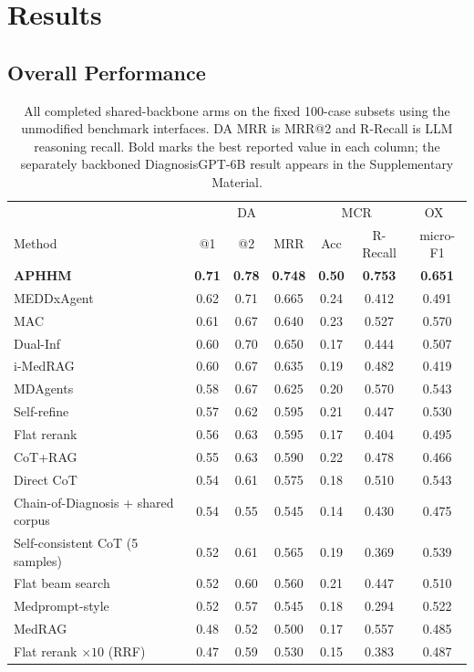 \documentclass[letterpaper]{article} %
\begin{document}
\section{Results}
\label{sec:results}

\subsection{Overall Performance}
\label{sec:main-results}

\begin{table}[t]
\centering
\small
\begin{tabular}{@{}lcccccc@{}}
\toprule
& \multicolumn{3}{c}{DA~\cite{diagnosisarena}} &
\multicolumn{2}{c}{MCR~\cite{medcasereasoning}} &
\multicolumn{1}{c}{OX~\cite{dualinf2025}} \\
Method & @1 & @2 & MRR & Acc & R-Recall & micro-F1 \\
\midrule
\textbf{APHHM} & \textbf{0.71} & \textbf{0.78} & \textbf{0.748} & \textbf{0.50} & \textbf{0.753} & \textbf{0.651} \\
MEDDxAgent & 0.62 & 0.71 & 0.665 & 0.24 & 0.412 & 0.491 \\
MAC & 0.61 & 0.67 & 0.640 & 0.23 & 0.527 & 0.570 \\
Dual-Inf & 0.60 & 0.70 & 0.650 & 0.17 & 0.444 & 0.507 \\
i-MedRAG & 0.60 & 0.67 & 0.635 & 0.19 & 0.482 & 0.419 \\
MDAgents & 0.58 & 0.67 & 0.625 & 0.20 & 0.570 & 0.543 \\
Self-refine & 0.57 & 0.62 & 0.595 & 0.21 & 0.447 & 0.530 \\
Flat rerank & 0.56 & 0.63 & 0.595 & 0.17 & 0.404 & 0.495 \\
CoT+RAG & 0.55 & 0.63 & 0.590 & 0.22 & 0.478 & 0.466 \\
Direct CoT & 0.54 & 0.61 & 0.575 & 0.18 & 0.510 & 0.543 \\
Chain-of-Diagnosis + shared corpus & 0.54 & 0.55 & 0.545 & 0.14 & 0.430 & 0.475 \\
Self-consistent CoT (5 samples) & 0.52 & 0.61 & 0.565 & 0.19 & 0.369 & 0.539 \\
Flat beam search & 0.52 & 0.60 & 0.560 & 0.21 & 0.447 & 0.510 \\
Medprompt-style & 0.52 & 0.57 & 0.545 & 0.18 & 0.294 & 0.522 \\
MedRAG & 0.48 & 0.52 & 0.500 & 0.17 & 0.557 & 0.485 \\
\midrule
Flat rerank $\times 10$ (RRF) & 0.47 & 0.59 & 0.530 & 0.15 & 0.383 & 0.487 \\
\bottomrule
\end{tabular}
\caption{All completed shared-backbone arms on the fixed 100-case subsets using the unmodified benchmark interfaces. DA MRR is MRR@2 and R-Recall is LLM reasoning recall. Bold marks the best reported value in each column; the separately backboned DiagnosisGPT-6B result appears in the Supplementary Material.}
\label{tab:main}

\end{table}
\end{document}
